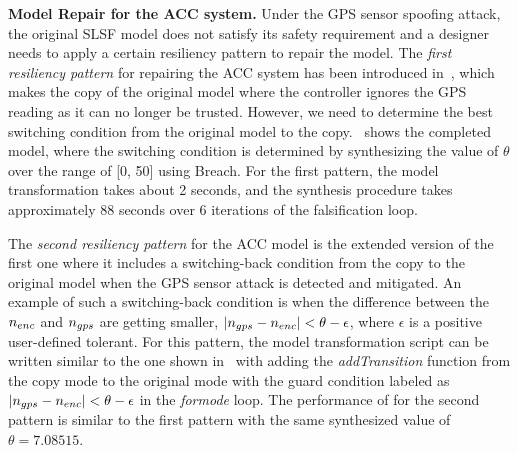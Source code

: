 \vspace{0.5em}
\noindent
{\bf Model Repair for the ACC system.} Under the GPS sensor spoofing  attack, the original SLSF model does not satisfy its safety requirement and a designer needs to apply a certain resiliency pattern to repair the model. The \emph{first resiliency pattern} for repairing the ACC system has been introduced in~, which makes the copy of the original model where the controller ignores the GPS reading as it can no longer be trusted. However, we need to determine the best switching condition from the original model to the copy.~ shows the completed model, where the switching condition is determined by synthesizing the value of $\theta$ over the range of [0, 50] using Breach. For the first pattern, the model transformation takes about 2 seconds, and the synthesis procedure takes approximately 88 seconds over 6 iterations of the falsification loop. %



The \emph{second resiliency pattern} for the ACC model is the extended version of the first one where it includes a switching-back condition from the copy to the original model when the GPS sensor attack is detected and mitigated. An example of such a switching-back condition is when the difference between the $n_{enc}$ and $n_{gps}$ are getting smaller, \ie $|n_{gps} -n_{enc}| < \theta - \epsilon$, where $\epsilon$ is a positive user-defined tolerant. For this pattern, the model transformation script can be written similar to the one shown in~ with adding the \emph{addTransition} function from the copy mode to the original mode with the guard condition labeled as $|n_{gps} -n_{enc}| < \theta - \epsilon$ in the \emph{formode} loop.
%
The performance of \toolreaffirm for the second pattern is similar to the first pattern with the same synthesized value of $\theta = 7.08515$.


